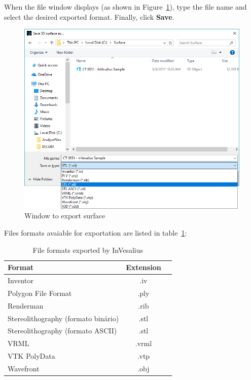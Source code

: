 When the file window displays (as shown in Figure~\ref{fig:export_data_window}), type the file name and select the desired exported format. Finally, click \textbf{Save}.

\begin{figure}[!htb]
\centering
\includegraphics[scale=0.4]{../user_guide_figures/invesalius_screen/export_surface_en.png}
\caption{Window to export surface}
\label{fig:export_data_window}
\end{figure}

Files formats avaiable for exportation are listed in table~\ref{tab:files_export_list}:

\begin{table}[h]
\centering
\caption{File formats exported by InVesalius}
\begin{tabular}{lcc}\\
\hline %
Format & Extension\\
\hline
\hline
Inventor & .iv\\
Polygon File Format & .ply\\
Renderman & .rib\\
Stereolithography (formato binário)& .stl\\
Stereolithography (formato ASCII) & .stl\\
VRML & .vrml\\
VTK PolyData & .vtp\\
Wavefront & .obj\\
\hline
\end{tabular}
\label{tab:files_export_list}
\end{table} 


